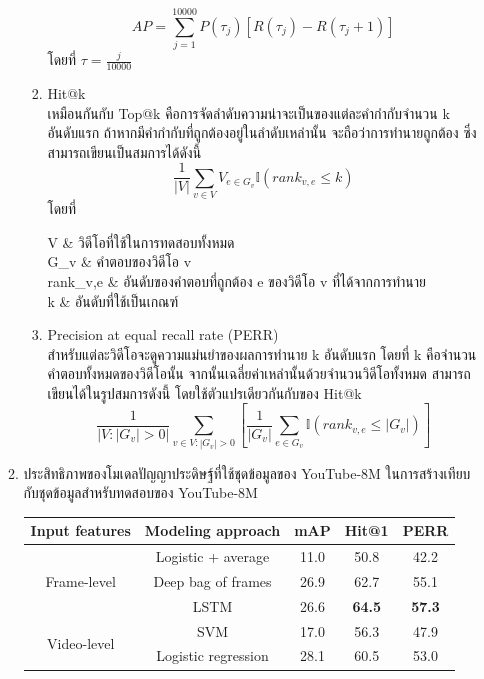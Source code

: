 \begin{enumerate}
\begin{enumerate}
\begin{enumerate}
\begin{equation}
					AP = \sum_{j=1}^{10000}P(\tau_j)[R(\tau_j)-R(\tau_j+1)]
				\end{equation}
				โดยที่ $\tau = \frac{j}{10000}$
				\item Hit@k\\
				เหมือนกันกับ Top@k คือการจัดลำดับความน่าจะเป็นของแต่ละคำกำกับจำนวน k อันดับแรก ถ้าหากมีคำกำกับที่ถูกต้องอยู่ในลำดับเหล่านั้น จะถือว่าการทำนายถูกต้อง 
				ซึ่งสามารถเขียนเป็นสมการได้ดังนี้
				\begin{equation}
					\frac{1}{|V|}\sum_{v\in V}V_{e\in G_v}\mathbb{I}(rank_{v,e} \leq k)
				\end{equation}
				โดยที่
				\begin{conditions}
					V & วิดีโอที่ใช้ในการทดสอบทั้งหมด\\
					G_v & คำตอบของวิดีโอ v\\
					rank_{v,e} & อันดับของคำตอบที่ถูกต้อง e ของวิดีโอ v ที่ได้จากการทำนาย\\
					k & อันดับที่ใช้เป็นเกณฑ์
				\end{conditions}
				\item Precision at equal recall rate (PERR)\\
				สำหรับแต่ละวิดีโอจะดูความแม่นยำของผลการทำนาย k อันดับแรก โดยที่ k คือจำนวนคำตอบทั้งหมดของวิดีโอนั้น จากนั้นเฉลี่ยค่าเหล่านั้นด้วยจำนวนวิดีโอทั้งหมด
				สามารถเขียนได้ในรูปสมการดังนี้ โดยใช้ตัวแปรเดียวกันกับของ Hit@k
				\begin{equation}
					\frac{1}{|V :|G_v|>0|}\sum_{v\in V:|G_v|>0}\left [\frac{1}{|G_v|}\sum_{e\in G_v}\mathbb{I}(rank_{v,e} \leq |G_v|) \right ]
				\end{equation}
			\end{enumerate}
		\item ประสิทธิภาพของโมเดลปัญญาประดิษฐ์ที่ใช้ชุดข้อมูลของ YouTube-8M ในการสร้างเทียบกับชุดข้อมูลสำหรับทดสอบของ YouTube-8M
			\begin{table}[!ht]
				\centering
				\begin{tabular}{|c|c|c|c|c|}
					\hline
					{Input features} & {Modeling approach} & {mAP} & Hit@1 & PERR\\
					\hline
					\multirow{3}{*}{Frame-level} & Logistic + average & 11.0 & 50.8 & 42.2\\
					& Deep bag of frames & 26.9 & 62.7 & 55.1\\
					& LSTM & 26.6 & \textbf{64.5} & \textbf{57.3}\\
					\hline
					\multirow{3}{*}{Video-level} & SVM & 17.0 & 56.3 & 47.9\\
					& Logistic regression & 28.1 & 60.5 & 53.0\\

\end{tabular}
\end{table}
\end{enumerate}
\end{enumerate}
